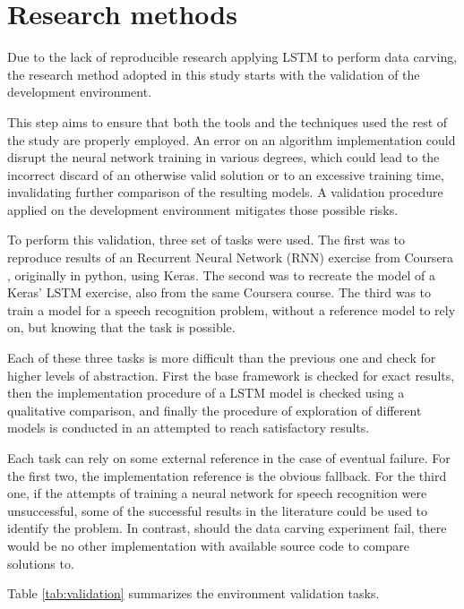 \section{Research methods}


Due to the lack of reproducible research applying LSTM to perform data carving, the research method adopted in this study starts with the validation of the development environment. 

This step aims to ensure that both the tools and the techniques used the rest of the study are properly employed. An error on an algorithm implementation could disrupt the neural network training in various degrees, which could lead to the incorrect discard of an otherwise valid solution or to an excessive training time, invalidating further comparison of the resulting models. A validation procedure applied on the development environment mitigates those possible risks. 

To perform this validation, three set of tasks were used. The first was to reproduce results of an Recurrent Neural Network (RNN) exercise from Coursera , originally in python, using Keras. The second was to recreate the model of a Keras' LSTM exercise, also from the same Coursera course. The third was to train a model for a speech recognition problem, without a reference model to rely on, but knowing that the task is possible. 

Each of these three tasks is more difficult than the previous one and check for higher levels of abstraction. First the base framework is checked for exact results, then the implementation procedure of a LSTM model is checked using a qualitative comparison, and finally the procedure of exploration of different models is conducted in an attempted to reach satisfactory results.

Each task can rely on some external reference in the case of eventual failure. For the first two, the implementation reference is the obvious fallback. For the third one, if the attempts of training a neural network for speech recognition were unsuccessful, some of the successful results in the literature could be used to identify the problem. In contrast, should the data carving experiment fail, there would be no other implementation with available source code to compare solutions to.

Table \ref{tab:validation} summarizes the environment validation tasks.

